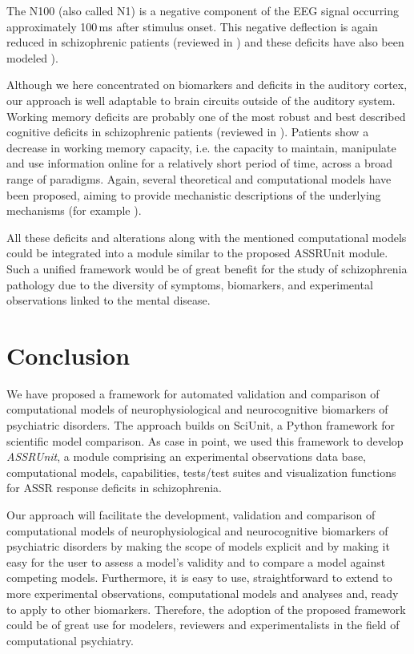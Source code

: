 \documentclass[a4paper,10pt]{article}
\begin{document}
The N100 (also called N1) is a negative component of the EEG signal occurring approximately 100\,ms after stimulus onset. This negative deflection is again reduced in schizophrenic patients 
(reviewed in \cite{Rosburg2008,Rissling2010,Javitt2008}) and these deficits have also been modeled \cite{Ventouras2000}).

Although we here concentrated on biomarkers and deficits in the auditory cortex, our approach is well adaptable to brain circuits outside of the auditory system. 
Working memory deficits are probably one of the most robust and best described cognitive deficits in schizophrenic patients (reviewed in \cite{Piskulic2007,Lee2005}). Patients
show a decrease in working memory capacity, i.e. the capacity to maintain, manipulate and use information online for a relatively short period of time, across a broad range of paradigms.
Again, several theoretical and computational models have been proposed, aiming to provide mechanistic descriptions of the underlying mechanisms (for example \cite{Compte2000,Durstewitz2000,Wang2004,Singh2006,Wang2001,Cano2012}). 

All these deficits and alterations along with the mentioned computational models could be integrated into a module similar to the proposed ASSRUnit module.
Such a unified framework would be of great benefit for the study of schizophrenia pathology due to the diversity of symptoms, biomarkers, and experimental observations linked to the mental disease.

\section{Conclusion}
We have proposed a framework for automated validation and comparison of computational models of neurophysiological and 
neurocognitive biomarkers of psychiatric disorders. The approach builds on
SciUnit, a Python framework for scientific model comparison. As case in point, we used this framework to develop \textit{ASSRUnit}, a module comprising 
an experimental observations data base, computational models, capabilities, tests/test suites and visualization functions for
ASSR response deficits in schizophrenia. 

Our approach will facilitate the development, validation and comparison of computational models of neurophysiological 
and neurocognitive biomarkers of psychiatric disorders by making the scope of models explicit and by 
making it easy for the user to assess a model's validity and to compare a model against competing models. Furthermore, it is easy to use, 
straightforward to extend to more experimental observations, computational models and analyses and,
ready to apply to other biomarkers. Therefore, the adoption of the proposed framework could be of great use for modelers, reviewers and 
experimentalists in the field of computational psychiatry.


 

\end{document}
